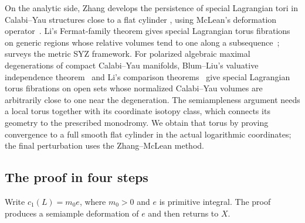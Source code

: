 On the analytic side, Zhang develops the persistence of special
Lagrangian tori in Calabi--Yau structures close to a flat cylinder
\cite[Section~4]{Zhang}, using McLean's deformation
operator~\cite{McLean}. Li's Fermat-family theorem gives special
Lagrangian torus fibrations on generic regions whose relative volumes
tend to one along a subsequence~\cite[Theorem~1.1]{LiFermat};
\cite{LiSurvey} surveys the metric SYZ framework.
For polarized algebraic maximal degenerations of compact Calabi--Yau
manifolds, Blum--Liu's valuative
independence theorem~\cite[Theorem~1.1]{BlumLiu2026} and Li's
comparison theorems~\cite[Theorems~1.4 and~1.8]{Li2026}
give special Lagrangian torus fibrations on open sets whose normalized
Calabi--Yau volumes are arbitrarily close to one near the degeneration.
The semiampleness argument needs a local torus together with its coordinate
isotopy class, which connects its geometry to the prescribed monodromy.
We obtain that torus by proving convergence to a full smooth flat
cylinder in the actual logarithmic coordinates; the final perturbation
uses the Zhang--McLean method.

\subsection{The proof in four steps}

Write $c_1(L)=m_0e$, where $m_0>0$ and $e$ is primitive integral.
The proof produces a semiample deformation of $e$ and then
returns to $X$.

